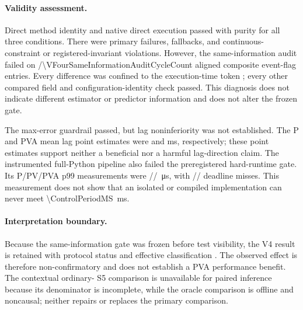 \paragraph{Validity assessment.}
Direct method identity and native direct execution passed with purity
\VFourDirectMethodPurityRate{} for all three conditions.  There were
\VFourPrimaryFailureCount{} primary failures,
\VFourFallbackEventCount{} fallbacks, and
\VFourContinuousConstraintViolationCount{} continuous-constraint or
registered-invariant violations.  However, the same-information audit failed
on \VFourSameInformationFailureCount/\num{\VFourSameInformationAuditCycleCount}
aligned composite event-flag entries.  Every difference was confined to the
execution-time token \texttt{}; every other compared field and
configuration-identity check passed.  This diagnosis does not indicate
different estimator or predictor information and does not alter the frozen
gate.

The max-error guardrail passed, but lag noninferiority was not established.
The P and PVA mean lag point estimates were
\VFourPMeanLagMS{} and \VFourPVAMeanLagMS{} ms, respectively; these point
estimates support neither a beneficial nor a harmful lag-direction claim.  The
instrumented full-Python pipeline also failed the preregistered hard-runtime
gate.  Its P/PV/PVA p99 measurements were
\VFourPRuntimePNinetyNineUS/\VFourPVRuntimePNinetyNineUS/%
\VFourPVARuntimePNinetyNineUS\,\si{\micro\second}, with
\VFourPDeadlineMissCount/\VFourPVDeadlineMissCount/%
\VFourPVADeadlineMissCount{} deadline misses.  This measurement does not show
that an isolated or compiled implementation can never meet
\SI{\ControlPeriodMS}{\milli\second}.

\paragraph{Interpretation boundary.}
Because the same-information gate was frozen before test visibility, the V4
result is retained with protocol status \texttt{\VFourProtocolStatus} and
effective classification \texttt{\VFourEffectiveClassification}.
The observed effect is therefore non-confirmatory and does not establish a PVA
performance benefit.  The contextual ordinary-\Ruckig{} S5 comparison is
unavailable for paired inference because its denominator is incomplete, while
the oracle comparison is offline and noncausal; neither repairs or replaces
the primary comparison.

